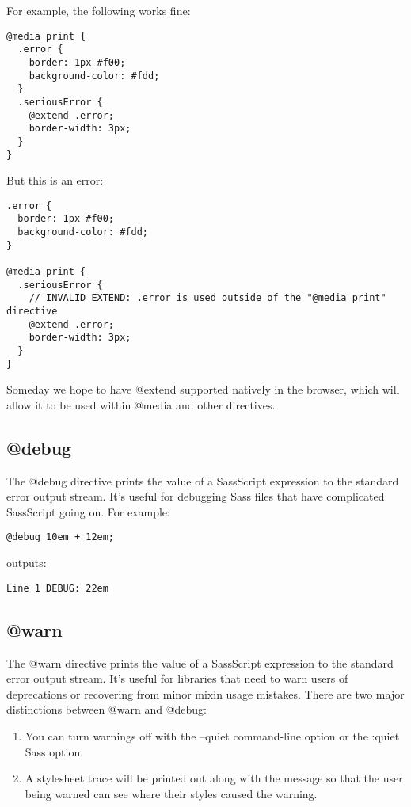 \documentclass[10pt]{article}
\begin{document}
 For example, the following works fine:
\begin{verbatim}
@media print {
  .error {
    border: 1px #f00;
    background-color: #fdd;
  }
  .seriousError {
    @extend .error;
    border-width: 3px;
  }
}
\end{verbatim}


 But this is an error:
\begin{verbatim}
.error {
  border: 1px #f00;
  background-color: #fdd;
}

@media print {
  .seriousError {
    // INVALID EXTEND: .error is used outside of the "@media print" directive
    @extend .error;
    border-width: 3px;
  }
}
\end{verbatim}


 Someday we hope to have @extend supported natively in the browser, which will allow it to be used within @media and other directives.
\subsection{@debug}


 The @debug directive prints the value of a SassScript expression to the standard error output stream. It’s useful for debugging Sass files that have complicated SassScript going on. For example:
\begin{verbatim}
@debug 10em + 12em;
\end{verbatim}


 outputs:
\begin{verbatim}
Line 1 DEBUG: 22em
\end{verbatim}
\subsection{@warn}


 The @warn directive prints the value of a SassScript expression to the standard error output stream. It’s useful for libraries that need to warn users of deprecations or recovering from minor mixin usage mistakes. There are two major distinctions between @warn and @debug:
\begin{enumerate}
\item You can turn warnings off with the --quiet command-line option or the :quiet Sass option.
\item A stylesheet trace will be printed out along with the message so that the user being warned can see where their styles caused the warning.

\end{enumerate}
\end{document}
